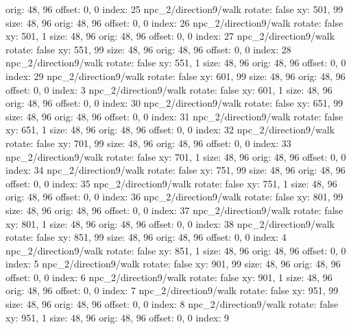   orig: 48, 96
  offset: 0, 0
  index: 25
npc_2/direction9/walk
  rotate: false
  xy: 501, 99
  size: 48, 96
  orig: 48, 96
  offset: 0, 0
  index: 26
npc_2/direction9/walk
  rotate: false
  xy: 501, 1
  size: 48, 96
  orig: 48, 96
  offset: 0, 0
  index: 27
npc_2/direction9/walk
  rotate: false
  xy: 551, 99
  size: 48, 96
  orig: 48, 96
  offset: 0, 0
  index: 28
npc_2/direction9/walk
  rotate: false
  xy: 551, 1
  size: 48, 96
  orig: 48, 96
  offset: 0, 0
  index: 29
npc_2/direction9/walk
  rotate: false
  xy: 601, 99
  size: 48, 96
  orig: 48, 96
  offset: 0, 0
  index: 3
npc_2/direction9/walk
  rotate: false
  xy: 601, 1
  size: 48, 96
  orig: 48, 96
  offset: 0, 0
  index: 30
npc_2/direction9/walk
  rotate: false
  xy: 651, 99
  size: 48, 96
  orig: 48, 96
  offset: 0, 0
  index: 31
npc_2/direction9/walk
  rotate: false
  xy: 651, 1
  size: 48, 96
  orig: 48, 96
  offset: 0, 0
  index: 32
npc_2/direction9/walk
  rotate: false
  xy: 701, 99
  size: 48, 96
  orig: 48, 96
  offset: 0, 0
  index: 33
npc_2/direction9/walk
  rotate: false
  xy: 701, 1
  size: 48, 96
  orig: 48, 96
  offset: 0, 0
  index: 34
npc_2/direction9/walk
  rotate: false
  xy: 751, 99
  size: 48, 96
  orig: 48, 96
  offset: 0, 0
  index: 35
npc_2/direction9/walk
  rotate: false
  xy: 751, 1
  size: 48, 96
  orig: 48, 96
  offset: 0, 0
  index: 36
npc_2/direction9/walk
  rotate: false
  xy: 801, 99
  size: 48, 96
  orig: 48, 96
  offset: 0, 0
  index: 37
npc_2/direction9/walk
  rotate: false
  xy: 801, 1
  size: 48, 96
  orig: 48, 96
  offset: 0, 0
  index: 38
npc_2/direction9/walk
  rotate: false
  xy: 851, 99
  size: 48, 96
  orig: 48, 96
  offset: 0, 0
  index: 4
npc_2/direction9/walk
  rotate: false
  xy: 851, 1
  size: 48, 96
  orig: 48, 96
  offset: 0, 0
  index: 5
npc_2/direction9/walk
  rotate: false
  xy: 901, 99
  size: 48, 96
  orig: 48, 96
  offset: 0, 0
  index: 6
npc_2/direction9/walk
  rotate: false
  xy: 901, 1
  size: 48, 96
  orig: 48, 96
  offset: 0, 0
  index: 7
npc_2/direction9/walk
  rotate: false
  xy: 951, 99
  size: 48, 96
  orig: 48, 96
  offset: 0, 0
  index: 8
npc_2/direction9/walk
  rotate: false
  xy: 951, 1
  size: 48, 96
  orig: 48, 96
  offset: 0, 0
  index: 9
